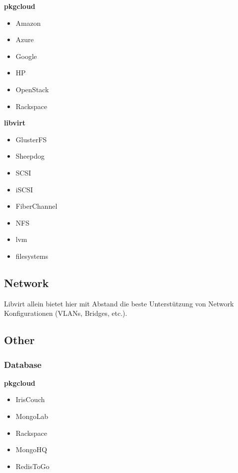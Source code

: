 \textbf{pkgcloud}
\begin{multicols}{2}
\begin{itemize}
\item Amazon
\item Azure
\item Google
\item HP
\item OpenStack
\item Rackspace
\end{itemize}
\end{multicols}

\textbf{libvirt}
\begin{multicols}{2}
\begin{itemize}
  \item GlusterFS
  \item Sheepdog
  \item SCSI
  \item iSCSI
  \item FiberChannel
  \item NFS
  \item lvm
  \item filesystems
\end{itemize}
\end{multicols}

\subsection{Network}
Libvirt allein bietet hier mit Abstand die beste Unterstützung von Network Konfigurationen 
(VLANs, Bridges, etc.).\\


\subsection{Other}
\subsubsection{Database}
\textbf{pkgcloud}
\begin{multicols}{2}
\begin{itemize}
\item IrisCouch
\item MongoLab
\item Rackspace
\item MongoHQ
\item RedisToGo
\end{itemize}
\end{multicols}
\newpage

